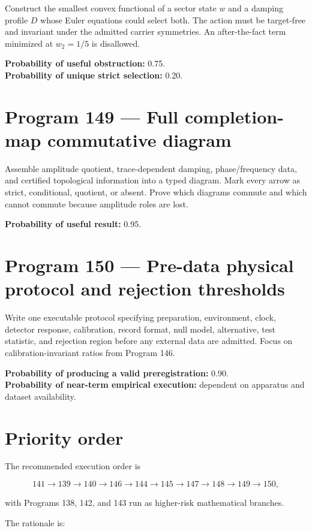 \documentclass[11pt,a4paper,openany]{report}
\begin{document}
Construct the smallest convex functional of a sector state \(w\) and a damping profile \(D\) whose Euler equations could select both. The action must be target-free and invariant under the admitted carrier symmetries. An after-the-fact term minimized at \(w_2=1/5\) is disallowed.

\textbf{Probability of useful obstruction:} 0.75.\\
\textbf{Probability of unique strict selection:} 0.20.

\section{Program 149 --- Full completion-map commutative diagram}

Assemble amplitude quotient, trace-dependent damping, phase/\allowbreak{}frequency data, and certified topological information into a typed diagram. Mark every arrow as strict, conditional, quotient, or absent. Prove which diagrams commute and which cannot commute because amplitude roles are lost.

\textbf{Probability of useful result:} 0.95.

\section{Program 150 --- Pre-data physical protocol and rejection thresholds}

Write one executable protocol specifying preparation, environment, clock, detector response, calibration, record format, null model, alternative, test statistic, and rejection region before any external data are admitted. Focus on calibration-invariant ratios from Program 146.

\textbf{Probability of producing a valid preregistration:} 0.90.\\
\textbf{Probability of near-term empirical execution:} dependent on apparatus and dataset availability.

\section{Priority order}

The recommended execution order is

\[
141\to139\to140\to146\to144\to145\to147\to148\to149\to150,
\]

with Programs 138, 142, and 143 run as higher-risk mathematical branches.

The rationale is:
\end{document}
